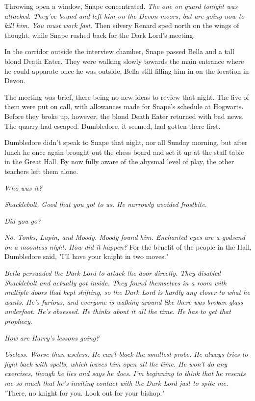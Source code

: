 \documentclass[a4paper,11pt]{article}
\begin{document}
Throwing open a window, Snape concentrated. \emph{The one on guard tonight was attacked. They've bound and left him on the Devon moors, but are going now to kill him. You must work fast.} Then silvery Renard sped north on the wings of thought, while Snape rushed back for the Dark Lord's meeting.

In the corridor outside the interview chamber, Snape passed Bella and a tall blond Death Eater. They were walking slowly towards the main entrance where he could apparate once he was outside, Bella still filling him in on the location in Devon.

The meeting was brief, there being no new ideas to review that night. The five of them were put on call, with allowances made for Snape's schedule at Hogwarts. Before they broke up, however, the blond Death Eater returned with bad news. The quarry had escaped. Dumbledore, it seemed, had gotten there first.

Dumbledore didn't speak to Snape that night, nor all Sunday morning, but after lunch he once again brought out the chess board and set it up at the staff table in the Great Hall. By now fully aware of the abysmal level of play, the other teachers left them alone.

\emph{Who was it?}

\emph{Shacklebolt. Good that you got to us. He narrowly avoided frostbite.}

\emph{Did you go?}

\emph{No. Tonks, Lupin, and Moody. Moody found him. Enchanted eyes are a godsend on a moonless night. How did it happen?} For the benefit of the people in the Hall, Dumbledore said, "I'll have your knight in two moves."

\emph{Bella persuaded the Dark Lord to attack the door directly. They disabled Shacklebolt and actually got inside. They found themselves in a room with multiple doors that kept shifting, so the Dark Lord is hardly any closer to what he wants. He's furious, and everyone is walking around like there was broken glass underfoot. He's obsessed. He thinks about it all the time. He has to get that prophecy.}

\emph{How are Harry's lessons going?}

\emph{Useless. Worse than useless. He can't block the smallest probe. He always tries to fight back with spells, which leaves him open all the time. He won't do any exercises, though he lies and says he does. I'm beginning to think that he resents me so much that he's inviting contact with the Dark Lord just to spite me.} "There, no knight for you. Look out for your bishop."
\end{document}
